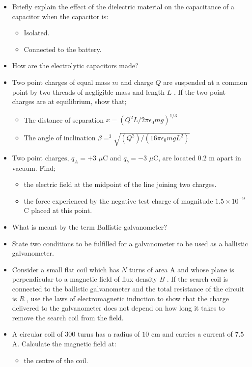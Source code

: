 \documentclass{article}
\begin{document}
\begin{itemize}
\item Briefly explain the effect of the dielectric material on the capacitance of a capacitor when the capacitor is:
 \begin{itemize}
\item Isolated. 
\item Connected to the battery.
\end{itemize}
\item How are the electrolytic capacitors made? 
\item Two point charges of equal mass $ m$ and charge $ Q$ are suspended at a common point by two threads of negligible mass and length $ L$ . If the two point charges are at equilibrium,  show that;
 \begin{itemize}
\item The distance of separation $ x=({Q^{2}L}/{2\pi\epsilon _{0}mg})^{1/3}$
\item The angle of inclination $ \beta = ^{3}\sqrt{(Q^{2})/(16\pi\epsilon _{0}mgL^{2})}$ 
\end{itemize}
\item Two point charges, $ q_{A}=+3$ $\mu$C and $ q_{b}=-3$ $\mu$C, are located $ 0.2$ m apart in vacuum. Find; 
 \begin{itemize}
\item the electric field at the midpoint of the line joining two charges. 
\item the force experienced by the negative test charge of magnitude $ 1.5 \times 10^{-9}$ C placed at this point.
\end{itemize}
\item What is meant by the term Ballistic galvanometer? 
\item State two conditions to be fulfilled for a galvanometer to be used as a ballistic galvanometer. 
\item Consider a small flat coil which has $ N$ turns of area A and whose plane is perpendicular to a magnetic field of flux density $ B$ . If the search coil is connected to the ballistic galvanometer and the total resistance of the circuit is $ R$ , use the laws of electromagnetic induction to show that the charge delivered to the galvanometer does not depend on how long it takes to remove the search coil from the field. 
\item A circular coil of $ 300$ turns has a radius of $ 10$ cm and carries a current of $ 7.5$ A. Calculate the magnetic field at:
 \begin{itemize}
\item the centre of the coil. 

\end{itemize}
\end{itemize}
\end{document}
